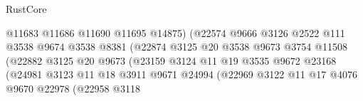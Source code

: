 \begin{lexlean}{RustCore}
\begin{coremodule}
                                            @11683
                                            @11686
                                            @11690
                                            @11695
                                            @14875)
                                          (@22574
                                            @9666
                                            @3126
                                            @2522
                                            @111
                                            @3538
                                            @9674
                                            @3538
                                            @8381
                                            (@22874
                                              @3125
                                              @20
                                              @3538
                                              @9673
                                              @3754
                                              @11508
                                              (@22882
                                                @3125
                                                @20
                                                @9673
                                                (@23159
                                                  @3124
                                                  @11
                                                  @19
                                                  @3535
                                                  @9672
                                                  @23168
                                                  (@24981
                                                    @3123
                                                    @11
                                                    @18
                                                    @3911
                                                    @9671
                                                    @24994
                                                    (@22969
                                                      @3122
                                                      @11
                                                      @17
                                                      @4076
                                                      @9670
                                                      @22978
                                                      (@22958
                                                        @3118

\end{coremodule}
\end{lexlean}
